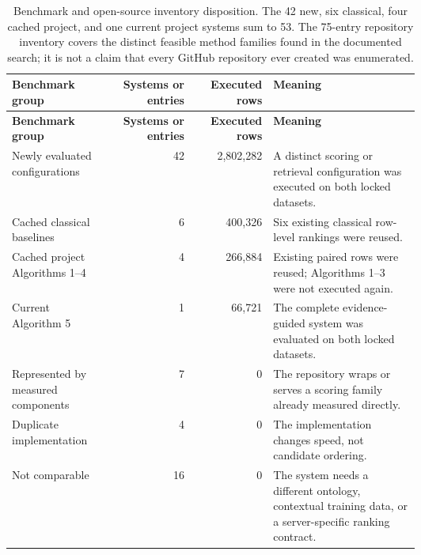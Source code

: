 \begin{small}
\setlength{\tabcolsep}{1.5pt}
\renewcommand{\arraystretch}{1.05}
\begin{longtable}{@{}L{0.24\linewidth}rrL{0.36\linewidth}@{}}
\caption{Benchmark and open-source inventory disposition. The 42 new, six classical, four cached project, and one current project systems sum to 53. The 75-entry repository inventory covers the distinct feasible method families found in the documented search; it is not a claim that every GitHub repository ever created was enumerated.}\label{tab:expanded-inventory-counts}\\
\toprule
\textbf{Benchmark group} & \textbf{Systems or entries} & \textbf{Executed rows} & \textbf{Meaning} \\
\midrule
\endfirsthead
\toprule
\textbf{Benchmark group} & \textbf{Systems or entries} & \textbf{Executed rows} & \textbf{Meaning} \\
\midrule
\endhead
Newly evaluated configurations & 42 & 2,802,282 & A distinct scoring or retrieval configuration was executed on both locked datasets. \\
Cached classical baselines & 6 & 400,326 & Six existing classical row-level rankings were reused. \\
Cached project Algorithms 1--4 & 4 & 266,884 & Existing paired rows were reused; Algorithms 1--3 were not executed again. \\
Current Algorithm 5 & 1 & 66,721 & The complete evidence-guided system was evaluated on both locked datasets. \\
Represented by measured components & 7 & 0 & The repository wraps or serves a scoring family already measured directly. \\
Duplicate implementation & 4 & 0 & The implementation changes speed, not candidate ordering. \\
Not comparable & 16 & 0 & The system needs a different ontology, contextual training data, or a server-specific ranking contract. \\
\bottomrule
\end{longtable}
\end{small}


